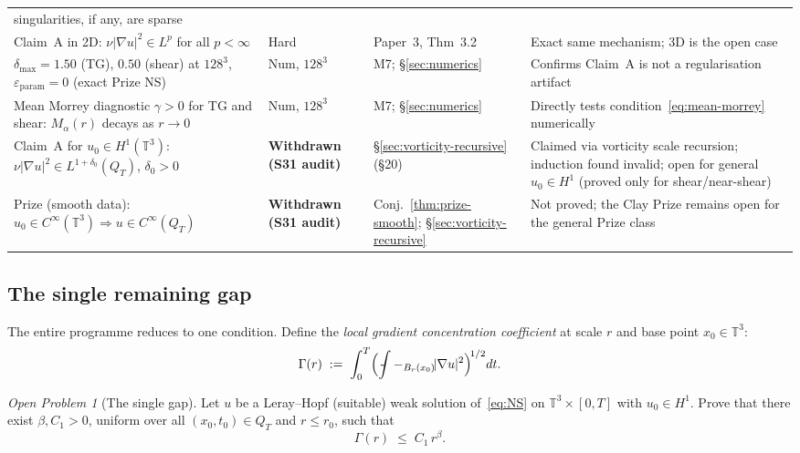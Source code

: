 \documentclass[11pt]{article}
\theoremstyle{definition}
\theoremstyle{remark}
\newtheorem{openproblem}[theorem]{Open Problem}
\newcommand{\T}{\mathbb{T}}
\newcommand{\Hs}[1]{H^{#1}}
\newcommand{\grad}{\nabla}
\newcommand{\Xint}{\mathop{\,\rlap{-}\!\!\int}\nolimits}
\newcommand{\dlt}{\delta}
\newcommand{\eps}{\varepsilon}
\begin{document}
\begin{table}[h]
\begin{tabular}{@{}p{5.2cm}lp{2.6cm}p{3.8cm}@{}}
    singularities, if any, are sparse \\[4pt]
Claim~A in 2D: $\nu|\grad u|^2\in L^p$ for all $p<\infty$
  & Hard & Paper~3, Thm~3.2 & Exact same mechanism; 3D is the
    open case \\[4pt]
$\dlt_{\max}=1.50$ (TG), $0.50$ (shear) at $128^3$,
  $\eps_{\mathrm{param}}=0$ (exact Prize NS)
  & Num, $128^3$ & M7; §\ref{sec:numerics} & Confirms Claim~A
    is not a regularisation artifact \\[4pt]
Mean Morrey diagnostic $\gamma>0$ for TG and shear:
  $M_\alpha(r)$ decays as $r\to 0$
  & Num, $128^3$ & M7; §\ref{sec:numerics} & Directly tests
    condition~\eqref{eq:mean-morrey} numerically \\[4pt]
Claim~A for $u_0\in H^1(\T^3)$:
  $\nu|\grad u|^2\in L^{1+\dlt_0}(Q_T)$, $\dlt_0>0$
  & \textbf{Withdrawn (S31 audit)} & §\ref{sec:vorticity-recursive} (§20) &
    Claimed via vorticity scale recursion; induction found invalid; open for
    general $u_0\in H^1$ (proved only for shear/near-shear) \\[4pt]
Prize (smooth data): $u_0\in C^\infty(\T^3)\Rightarrow u\in C^\infty(Q_T)$
  & \textbf{Withdrawn (S31 audit)} & Conj.~\ref{thm:prize-smooth}; §\ref{sec:vorticity-recursive} &
    Not proved; the Clay Prize remains open for the general Prize class \\
\bottomrule
\end{tabular}
\end{table}

\subsection{The single remaining gap}
\label{sec:gap-precise}

The entire programme reduces to one condition.  Define the
\emph{local gradient concentration coefficient} at scale $r$ and base point
$x_0\in\T^3$:
\begin{equation}\label{eq:Gamma-8}
  \Gamma(r) \;:=\; \int_0^T
    \Bigl(\Xint-_{B_r(x_0)}\!|\grad u|^2\Bigr)^{\!1/2}dt.
\end{equation}

\begin{openproblem}[The single gap]\label{op:gamma}
  Let $u$ be a Leray--Hopf (suitable) weak solution of~\eqref{eq:NS}
  on $\T^3\times[0,T]$ with $u_0\in\Hs{1}$.  Prove that there exist
  $\beta,C_1>0$, uniform over all $(x_0,t_0)\in Q_T$ and $r\leq r_0$, such
  that
  \begin{equation}\label{eq:Gamma-bound}
    \Gamma(r) \;\leq\; C_1\,r^\beta.
  \end{equation}
\end{openproblem}
\end{document}
